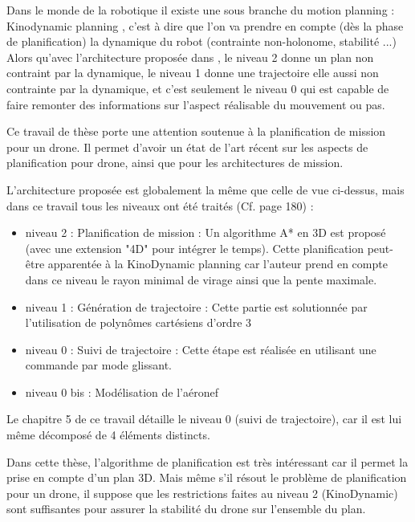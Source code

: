 Dans le monde de la robotique il existe une sous branche du motion planning : Kinodynamic planning \cite{masoud_kinodynamic_2010}, c'est à dire que l'on va prendre en compte (dès la phase de planification) la dynamique du robot (contrainte non-holonome, stabilité ...)
Alors qu'avec l'architecture proposée dans \cite{chanthery_planification_2005}, le niveau 2 donne un plan non contraint par la dynamique, le niveau 1 donne une trajectoire elle aussi non contrainte par la dynamique, et c'est seulement le niveau 0 qui est capable de faire remonter des informations sur l'aspect réalisable du mouvement ou pas.

\cite{dicheva_planification_2012} Ce travail de thèse porte une attention soutenue à la planification de mission pour un drone. Il permet d'avoir un état de l'art récent sur les aspects de planification pour drone, ainsi que pour les architectures de mission.

L'architecture proposée est globalement la même que celle de \cite{chanthery_planification_2005} vue ci-dessus, mais dans ce travail tous les niveaux ont été traités (Cf. page 180) : 
\begin{itemize}
	\item niveau 2 : Planification de mission : Un algorithme A* en 3D est proposé (avec une extension "4D" pour intégrer le temps). Cette planification peut-être apparentée à la KinoDynamic planning car l'auteur prend en compte dans ce niveau le rayon minimal de virage ainsi que la pente maximale.
	\item niveau 1 : Génération de trajectoire : Cette partie est solutionnée par l'utilisation de polynômes cartésiens d'ordre 3
	\item niveau 0 : Suivi de trajectoire : Cette étape est réalisée en utilisant une commande par mode glissant.
	\item niveau 0 bis : Modélisation de l'aéronef
\end{itemize} 

Le chapitre 5 de ce travail détaille le niveau 0 (suivi de trajectoire), car il est lui même décomposé de 4 éléments distincts.

Dans cette thèse, l'algorithme de planification est très intéressant car il permet la prise en compte d'un plan 3D. Mais même s'il résout le problème de planification pour un drone, il suppose que les restrictions faites au niveau 2 (KinoDynamic) sont suffisantes pour assurer la stabilité du drone sur l'ensemble du plan.


